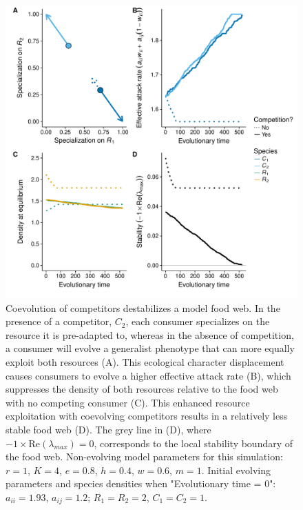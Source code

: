 \documentclass[11pt]{article}
\begin{document}
\begin{figure}[h!]
\includegraphics[scale = 0.6]{fig_theory.pdf}
\caption{Coevolution of competitors destabilizes a model food web. In the presence of a competitor, $C_2$, each consumer specializes on the resource it is pre-adapted to, whereas in the absence of competition, a consumer will evolve a generalist phenotype that can more equally exploit both resources (A). This ecological character displacement causes consumers to evolve a higher effective attack rate (B), which suppresses the density of both resources relative to the food web with no competing consumer (C). This enhanced resource exploitation with coevolving competitors results in a relatively less stable food web (D). The grey line in (D), where $-1\times \text{Re}(\lambda_{max})=0$, corresponds to the local stability boundary of the food web. Non-evolving model parameters for this simulation: $r=1$, $K=4$, $e=0.8$, $h=0.4$, $w=0.6$, $m=1$. Initial evolving parameters and species densities when "Evolutionary time = 0": $a_{ii}=1.93$, $a_{ij}=1.2$; $R_1=R_2=2$, $C_1=C_2=1$.}
\label{Fig:theory}
\end{figure}
\end{document}
